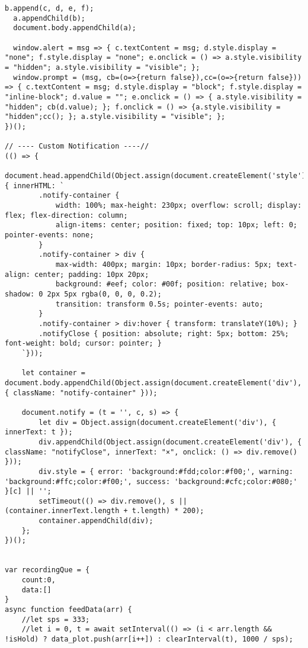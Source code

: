 \begin{lstlisting}[style=htmlcssjs]
  b.append(c, d, e, f);
  a.appendChild(b);
  document.body.appendChild(a);

  window.alert = msg => { c.textContent = msg; d.style.display = "none"; f.style.display = "none"; e.onclick = () => a.style.visibility = "hidden"; a.style.visibility = "visible"; };
  window.prompt = (msg, cb=(o=>{return false}),cc=(o=>{return false})) => { c.textContent = msg; d.style.display = "block"; f.style.display = "inline-block"; d.value = ""; e.onclick = () => { a.style.visibility = "hidden"; cb(d.value); }; f.onclick = () => {a.style.visibility = "hidden";cc(); }; a.style.visibility = "visible"; };
})();

// ---- Custom Notification ----//
(() => {
    document.head.appendChild(Object.assign(document.createElement('style'), { innerHTML: `
        .notify-container {
            width: 100%; max-height: 230px; overflow: scroll; display: flex; flex-direction: column;
            align-items: center; position: fixed; top: 10px; left: 0; pointer-events: none;
        }
        .notify-container > div {
            max-width: 400px; margin: 10px; border-radius: 5px; text-align: center; padding: 10px 20px;
            background: #eef; color: #00f; position: relative; box-shadow: 0 2px 5px rgba(0, 0, 0, 0.2);
            transition: transform 0.5s; pointer-events: auto;
        }
        .notify-container > div:hover { transform: translateY(10%); }
        .notifyClose { position: absolute; right: 5px; bottom: 25%; font-weight: bold; cursor: pointer; }
    `}));

    let container = document.body.appendChild(Object.assign(document.createElement('div'), { className: "notify-container" }));

    document.notify = (t = '', c, s) => {
        let div = Object.assign(document.createElement('div'), { innerText: t });
        div.appendChild(Object.assign(document.createElement('div'), { className: "notifyClose", innerText: "×", onclick: () => div.remove() }));
        div.style = { error: 'background:#fdd;color:#f00;', warning: 'background:#ffc;color:#f00;', success: 'background:#cfc;color:#080;' }[c] || '';
        setTimeout(() => div.remove(), s || (container.innerText.length + t.length) * 200);
        container.appendChild(div);
    };
})();


var recordingQue = {
    count:0,
    data:[]
}
async function feedData(arr) {
    //let sps = 333;
    //let i = 0, t = await setInterval(() => (i < arr.length && !isHold) ? data_plot.push(arr[i++]) : clearInterval(t), 1000 / sps);


\end{lstlisting}
